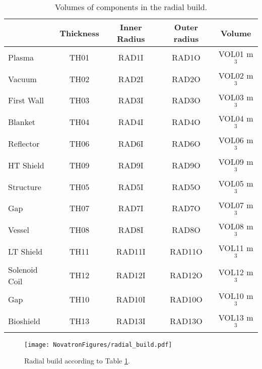\begin{table}[h!]
    \centering
    \begin{tabular}{l c  c c c}
    \hline
        &	Thickness	&	Inner Radius	&	Outer radius	&	Volume		\\
        \hline
Plasma	&	TH01	&	RAD1I	&	RAD1O	&	VOL01	m$^{3}$	\\
Vacuum	&	TH02	&	RAD2I	&	RAD2O	&	VOL02	m$^{3}$	\\
First Wall	&	TH03	&	RAD3I	&	RAD3O	&	VOL03	m$^{3}$	\\
Blanket	&	TH04	&	RAD4I	&	RAD4O	&	VOL04	m$^{3}$	\\
Reflector	&	TH06	&	RAD6I	&	RAD6O	&	VOL06	m$^{3}$	\\
HT Shield	&	TH09	&	RAD9I	&	RAD9O	&	VOL09	m$^{3}$	\\
Structure	&	TH05	&	RAD5I	&	RAD5O	&	VOL05	m$^{3}$	\\
Gap	&	TH07	&	RAD7I	&	RAD7O	&	VOL07	m$^{3}$	\\
Vessel	&	TH08	&	RAD8I	&	RAD8O	&	VOL08	m$^{3}$	\\
LT Shield	&	TH11	&	RAD11I	&	RAD11O	&	VOL11	m$^{3}$	\\
Solenoid Coil&	TH12	&	RAD12I	&	RAD12O	&	VOL12	m$^{3}$	\\
Gap	&	TH10	&	RAD10I	&	RAD10O	&	VOL10	m$^{3}$	\\
Bioshield	&	TH13	&	RAD13I	&	RAD13O	&	VOL13	m$^{3}$	\\

        \hline
    \end{tabular}
    \caption{Volumes of components in the radial build.}
    \label{tab:volumes}
\end{table}

\begin{figure}
    \centering
    \texttt{[image: NovatronFigures/radial\_build.pdf]}
    \caption{Radial build according to Table \ref{tab:volumes}.}
    \label{fig:radial}
\end{figure}



